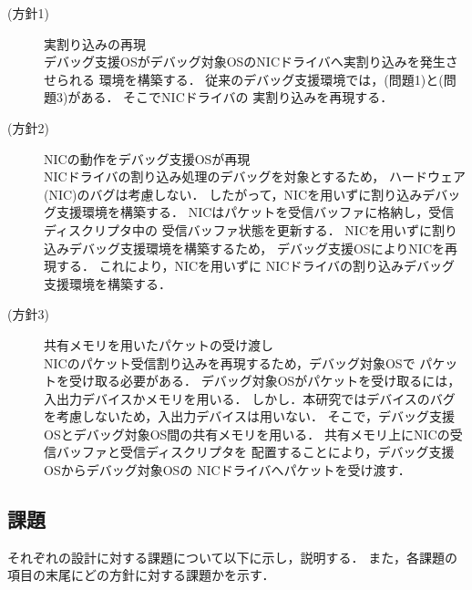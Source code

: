 \documentclass[submit,techreq,noauthor,dvipdfmx]{ipsj}
\begin{document}
\begin{description}
    \item[(方針1)] 実割り込みの再現\\
        デバッグ支援OSがデバッグ対象OSのNICドライバへ実割り込みを発生させられる
        環境を構築する．
        従来のデバッグ支援環境では，(問題1)と(問題3)がある．
        そこでNICドライバの
        実割り込みを再現する．
    \item[(方針2)] NICの動作をデバッグ支援OSが再現\\
        NICドライバの割り込み処理のデバッグを対象とするため，
        ハードウェア(NIC)のバグは考慮しない．
        したがって，NICを用いずに割り込みデバッグ支援環境を構築する．
        NICはパケットを受信バッファに格納し，受信ディスクリプタ中の
        受信バッファ状態を更新する．
        NICを用いずに割り込みデバッグ支援環境を構築するため，
        デバッグ支援OSによりNICを再現する．
        これにより，NICを用いずに
        NICドライバの割り込みデバッグ支援環境を構築する．
    \item[(方針3)] 共有メモリを用いたパケットの受け渡し\\
        NICのパケット受信割り込みを再現するため，デバッグ対象OSで
        パケットを受け取る必要がある．
        デバッグ対象OSがパケットを受け取るには，
        入出力デバイスかメモリを用いる．
        しかし．本研究ではデバイスのバグを考慮しないため，入出力デバイスは用いない．
        そこで，デバッグ支援OSとデバッグ対象OS間の共有メモリを用いる．
        共有メモリ上にNICの受信バッファと受信ディスクリプタを
        配置することにより，デバッグ支援OSからデバッグ対象OSの
        NICドライバへパケットを受け渡す．
\end{description}

\subsection{課題}\label{sec:challenge}

それぞれの設計に対する課題について以下に示し，説明する．
また，各課題の項目の末尾にどの方針に対する課題かを示す．
\end{document}
